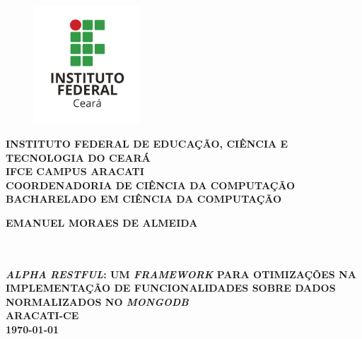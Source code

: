 \thispagestyle{empty}
\vfill
\begin{center}

\begin{figure}[t]
\centering
\includegraphics[width=4cm]{figuras/ifce-ceara.png}%
\end{figure}
\vspace{0.5 cm}
{\normalsize\bfseries INSTITUTO FEDERAL DE EDUCAÇÃO, CIÊNCIA E TECNOLOGIA DO CEARÁ} \\
{\normalsize\bfseries IFCE CAMPUS ARACATI} \\
{\normalsize\bfseries COORDENADORIA DE CIÊNCIA DA COMPUTAÇÃO}  \\ 
{\normalsize\bfseries BACHARELADO EM CIÊNCIA DA COMPUTAÇÃO}  \\ 

\vspace*{1in}
\begin{large} \bfseries \uppercase{Emanuel Moraes de Almeida} \end{large}\\[0.4in]

\vspace*{4cm}
\noindent \\
\large\bfseries{\uppercase{\textit{Alpha} \textit{Restful}: Um \textit{Framework} para Otimizações na Implementação de Funcionalidades Sobre Dados Normalizados no \textit{MongoDB}}} \\
\vfill
\normalsize\bfseries{ARACATI-CE\\\today}

\end{center}
\normalsize